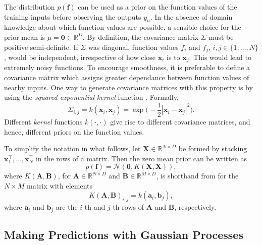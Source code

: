 \documentclass[msc,deptreport.inf]{infthesis} %
\newcommand{\matr}[1]{\mathbf{#1}}
\newcommand{\R}{\mathbb R}
\begin{document}
The distribution $p(\matr{f})$ can be used as a prior on the function values of the training inputs before observing the outputs $y_n$. In the absence of domain knowledge about which function values are possible, a sensible choice for the prior mean is $\mu = \matr{0} \in \R^D$. By definition, the covariance matrix $\Sigma$ must be positive semi-definite. If $\Sigma$ was diagonal, function values $f_i$ and $f_j$, $i, j \in \{1, \dots, N\}$, would be independent, irrespective of how close $\matr{x}_i$ is to $\matr{x}_j$. This would lead to extremely noisy functions. To encourage smoothness, it is preferable to define a covariance matrix which assigns greater dependance between function values of nearby inputs. One way to generate covariance matrices with this property is by using the \emph{squared exponential kernel} function \cite{rasmussen2006}. Formally,
 \begin{equation}
	\Sigma_{i, j} = k(\matr{x}_i, \matr{x}_j) = \exp \Big( -\frac{1}{2} |\matr{x}_i - \matr{x}_j|^2 \Big).
\end{equation}
Different \emph{kernel} functions $k(\cdot, \cdot)$ give rise to different covariance matrices, and hence, different priors on the function values. 

To simplify the notation in what follows, let $\matr{X} \in \R^{N\times D}$ be formed by stacking $\matr{x}_1^\intercal,\dots,\matr{x}_N^\intercal$ in the rows of a matrix. Then the zero mean prior can be written as 
\begin{equation}
	p(\matr{f}) = \mathcal{N}(\matr{0}, K(\matr{X}, \matr{X})),
\end{equation}
where $K(\matr{A}, \matr{B})$, for $\matr{A} \in \R^{N\times D}$ and $\matr{B} \in \R^{M\times D}$, is shorthand from \cite{rasmussen2006} for the $N \times M$ matrix with elements
\begin{equation}
	K(\matr{A}, \matr{B})_{i, j} = k(\matr{a}_i, \matr{b}_j),
\end{equation} 
where $\matr{a}_i$ and $\matr{b}_j$ are the $i$-th and $j$-th rows of $\matr{A}$ and $\matr{B}$, respectively.


\subsection{Making Predictions with Gaussian Processes}
\end{document}
